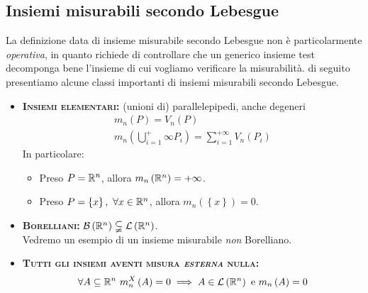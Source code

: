 \subsection{Insiemi misurabili secondo Lebesgue}
La definizione data di insieme misurabile secondo Lebesgue non è particolarmente \textit{operativa}, in quanto richiede di controllare che un generico insieme test decomponga bene l'insieme di cui vogliamo verificare la misurabilità. di seguito presentiamo alcune classi importanti di insiemi misurabili secondo Lebesgue. %
\begin{itemize}
	\item \textsc{\textbf{Insiemi elementari:}} (unioni di) parallelepipedi, anche degeneri
	\begin{gather*}
		m_n\left(P\right)=V_n\left(P\right)\\
		m_n\left(\bigcup_{i=1}^+\infty P_i\right)=\sum_{i=1}^{+\infty}V_n\left(P_i\right)
	\end{gather*}
In particolare:
\begin{itemize}
	\item Preso $P=\mathbb{R}^n$, allora $m_n\left(\mathbb{R}^n\right)=+\infty$.
	\item Preso $P=\left\{x\right\},\ \forall x\in\mathbb{R}^n$, allora $m_n\left(\left\{x\right\}\right)=0$.
\end{itemize}
\item \textsc{\textbf{Borelliani:}} $\mathcal{B}\left(\mathbb{R}^n\right)\subsetneqq\mathcal{L}\left(\mathbb{R}^n\right)$.\\
Vedremo un esempio di un insieme misurabile \textit{non} Borelliano.
\item \textsc{\textbf{Tutti gli insiemi aventi misura \textit{esterna} nulla:}}
\begin{equation*}
	\forall A\subseteq \realset^n\ m_n^X\left(A\right)=0\implies A\in\mathcal{L}\left(\realset^n\right)\text{ e }m_n\left(A\right)=0
\end{equation*}
\end{itemize}

